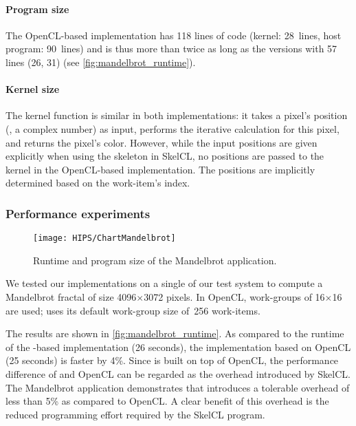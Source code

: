 \paragraph{Program size}
The OpenCL-based implementation has 118 lines of code (kernel: 28~lines, host program: 90~lines) and is thus more than twice as long as the \SkelCL versions with 57 lines (26, 31) (see \autoref{fig:mandelbrot_runtime}).

\paragraph{Kernel size}
The kernel function is similar in both implementations: it takes a pixel's position (\ie, a complex number) as input, performs the iterative calculation for this pixel, and returns the pixel's color.
However, while the input positions are given explicitly when using the \map skeleton in SkelCL, no positions are passed to the kernel in the OpenCL-based implementation.
The positions are implicitly determined based on the work-item's index.

\subsubsection*{Performance experiments}
\label{sec:mandelbrot:performance}

\begin{figure}[tb]
    \centering
    \texttt{[image: HIPS/ChartMandelbrot]}
    \caption{Runtime and program size of the Mandelbrot application.}
    \label{fig:mandelbrot_runtime}
\end{figure}%


We tested our implementations on a single \GPU of our test system to compute a Mandelbrot fractal of size 4096$\times$3072 pixels.
In OpenCL, work-groups of 16$\times$16 are used; \SkelCL uses its default work-group size of~256 work-items.

The results are shown in \autoref{fig:mandelbrot_runtime}.
As compared to the runtime of the \SkelCL-based implementation (26 seconds), the implementation based on OpenCL (25 seconds) is faster by 4\%.
Since \SkelCL is built on top of OpenCL, the performance difference of \SkelCL and OpenCL can be regarded as the overhead introduced by SkelCL.
The Mandelbrot application demonstrates that \SkelCL introduces a tolerable overhead of less than 5\% as compared to OpenCL.
A clear benefit of this overhead is the reduced programming effort required by the SkelCL program.

